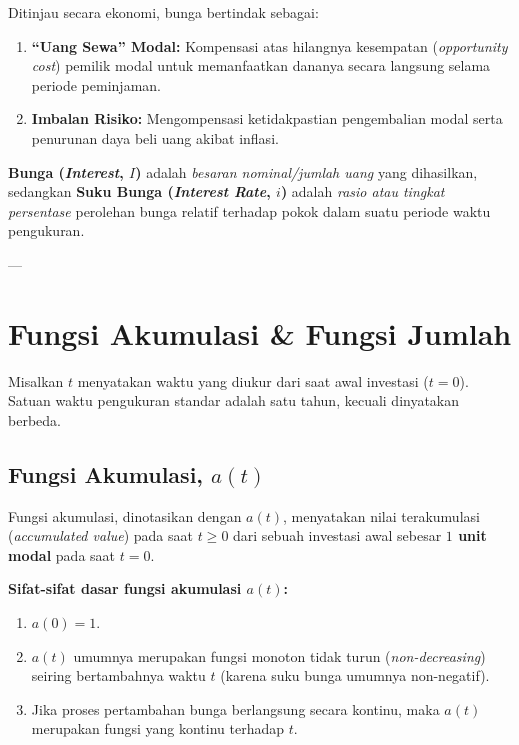 \documentclass[11pt,a4paper]{article}
\begin{document}
Ditinjau secara ekonomi, bunga bertindak sebagai:
\begin{enumerate}[label=(\alph*)]
    \item \textbf{``Uang Sewa'' Modal:} Kompensasi atas hilangnya kesempatan (\textit{opportunity cost}) pemilik modal untuk memanfaatkan dananya secara langsung selama periode peminjaman.
    \item \textbf{Imbalan Risiko:} Mengompensasi ketidakpastian pengembalian modal serta penurunan daya beli uang akibat inflasi.
\end{enumerate}

\begin{notebox}
\textbf{Bunga (\textit{Interest}, $I$)} adalah \emph{besaran nominal/jumlah uang} yang dihasilkan, sedangkan \textbf{Suku Bunga (\textit{Interest Rate}, $i$)} adalah \emph{rasio atau tingkat persentase} perolehan bunga relatif terhadap pokok dalam suatu periode waktu pengukuran.
\end{notebox}

---

\section{Fungsi Akumulasi \& Fungsi Jumlah}

Misalkan $t$ menyatakan waktu yang diukur dari saat awal investasi ($t=0$). Satuan waktu pengukuran standar adalah satu tahun, kecuali dinyatakan berbeda.

\subsection{Fungsi Akumulasi, $a(t)$}
\begin{definitionbox}
Fungsi akumulasi, dinotasikan dengan $a(t)$, menyatakan nilai terakumulasi (\textit{accumulated value}) pada saat $t \ge 0$ dari sebuah investasi awal sebesar \textbf{$1$ unit modal} pada saat $t = 0$.
\end{definitionbox}

\textbf{Sifat-sifat dasar fungsi akumulasi $a(t)$:}
\begin{enumerate}[label=\arabic*.]
    \item $a(0) = 1$.
    \item $a(t)$ umumnya merupakan fungsi monoton tidak turun (\textit{non-decreasing}) seiring bertambahnya waktu $t$ (karena suku bunga umumnya non-negatif).
    \item Jika proses pertambahan bunga berlangsung secara kontinu, maka $a(t)$ merupakan fungsi yang kontinu terhadap $t$.
\end{enumerate}
\end{document}
